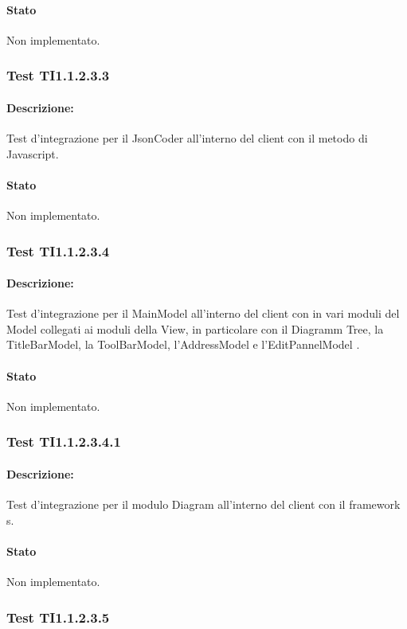 \documentclass[../PianoDiQualifica.tex]{subfiles}
\begin{document}
	\paragraph{Stato} Non implementato.
	\subsubsection{Test TI1.1.2.3.3}
	\paragraph{Descrizione:} Test d'integrazione per il JsonCoder all'interno del client con il metodo  di Javascript. %
	\paragraph{Stato} Non implementato.
	\subsubsection{Test TI1.1.2.3.4}
	\paragraph{Descrizione:} Test d'integrazione per il MainModel all'interno del client con in vari moduli del Model collegati ai moduli della View, in particolare con il Diagramm Tree, la TitleBarModel, la ToolBarModel, l'AddressModel e l'EditPannelModel . 
	\paragraph{Stato} Non implementato.
	\subsubsection{Test TI1.1.2.3.4.1}
	\paragraph{Descrizione:} Test d'integrazione per il modulo Diagram all'interno del client con il framework s. 
	\paragraph{Stato} Non implementato.
	\subsubsection{Test TI1.1.2.3.5}
\end{document}
